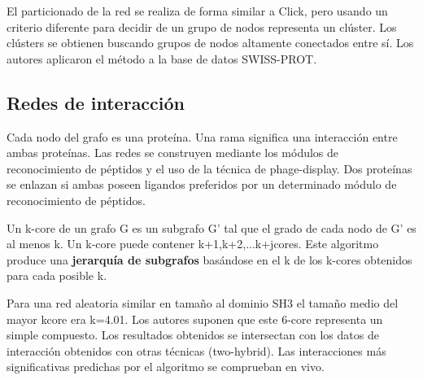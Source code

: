 El particionado de la red se realiza de forma similar a Click, pero usando un criterio diferente para decidir de un grupo de nodos representa un clúster. Los clústers se obtienen buscando grupos de nodos altamente conectados entre sí. Los autores aplicaron el método a la base de datos SWISS-PROT. 

\subsection{Redes de interacción}
Cada nodo del grafo es una proteína. Una rama significa una interacción entre ambas proteínas. Las redes se construyen mediante los módulos de reconocimiento de péptidos y el uso de la técnica de phage-display. Dos proteínas se enlazan si ambas poseen ligandos preferidos por un determinado módulo de reconocimiento de péptidos.

Un k-core de un grafo G es un subgrafo G’ tal que el grado de cada nodo de G’ es al menos k. Un k-core puede contener k+1,k+2,...k+jcores. Este algoritmo produce una \textbf{jerarquía de subgrafos} basándose en el k de los k-cores obtenidos para cada posible k.

Para una red aleatoria similar en tamaño al dominio SH3 el tamaño medio del mayor kcore era k=4.01. Los autores suponen que este 6-core representa un simple compuesto. Los resultados obtenidos se intersectan con los datos de interacción obtenidos con otras técnicas (two-hybrid). Las interacciones más significativas predichas por el algoritmo se comprueban en vivo.
